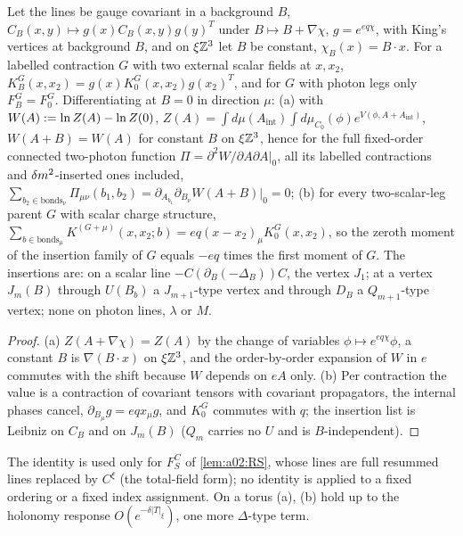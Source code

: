 \begin{lemma}\label{lem:a02:GC}
Let the lines be gauge covariant in a background $B$, $C_B(x,y)\mapsto g(x)C_B(x,y)g(y)^T$ under $B\mapsto B+\nabla\chi$, $g=e^{eq\chi}$, with King's vertices \cite[(3.18)--(3.23)]{K1} at background $B$, and on $\xi\mathbb Z^3$ let $B$ be constant, $\chi_B(x)=B\cdot x$. For a labelled contraction $G$ with two external scalar fields at $x,x_2$, $K^G_B(x,x_2)=g(x)K^G_0(x,x_2)g(x_2)^T$, and for $G$ with photon legs only $F^G_B=F^G_0$. Differentiating at $B=0$ in direction $\mu$: \textup{(a)} with $W(A):=\ln Z(A)-\ln Z(0)$, $Z(A)=\int d\mu(A_{\mathrm{int}})\int d\mu_{C_0}(\phi)e^{V(\phi,A+A_{\mathrm{int}})}$, $W(A+B)=W(A)$ for constant $B$ on $\xi\mathbb Z^3$, hence for the full fixed-order connected two-photon function $\Pi=\partial^2W/\partial A\partial A|_0$, all its labelled contractions and $\delta m^2$-inserted ones included, $\sum_{b_2\in\mathrm{bonds}_\nu}\Pi_{\mu\nu}(b_1,b_2)=\partial_{A_{b_1}}\partial_{B_\nu}W(A+B)|_0=0$; \textup{(b)} for every two-scalar-leg parent $G$ with scalar charge structure, $\sum_{b\in\mathrm{bonds}_\mu}K^{(G+\mu)}(x,x_2;b)=eq(x-x_2)_\mu K^G_0(x,x_2)$, so the zeroth moment of the insertion family of $G$ equals $-eq$ times the first moment of $G$. The insertions are: on a scalar line $-C(\partial_B(-\Delta_B))C$, the vertex $J_1$; at a vertex $J_m(B)$ through $U(B_b)$ a $J_{m+1}$-type vertex and through $D_B$ a $Q_{m+1}$-type vertex; none on photon lines, $\lambda$ or $M$.
\end{lemma}
\begin{proof}
(a) $Z(A+\nabla\chi)=Z(A)$ by the change of variables $\phi\mapsto e^{eq\chi}\phi$, a constant $B$ is $\nabla(B\cdot x)$ on $\xi\mathbb Z^3$, and the order-by-order expansion of $W$ in $e$ commutes with the shift because $W$ depends on $eA$ only. (b) Per contraction the value is a contraction of covariant tensors with covariant propagators, the internal phases cancel, $\partial_{B_\mu}g=eqx_\mu g$, and $K^G_0$ commutes with $q$; the insertion list is Leibniz on $C_B$ and on $J_m(B)$ \cite[(3.22)]{K1} ($Q_m$ carries no $U$ and is $B$-independent).
\end{proof}
The identity is used only for $F^C_S$ of \cref{lem:a02:RS}, whose lines are full resummed lines replaced by $C^\xi$ (the total-field form); no identity is applied to a fixed ordering or a fixed index assignment. On a torus (a), (b) hold up to the holonomy response $O(e^{-\delta|T|_\xi})$, one more $\Delta$-type term.


